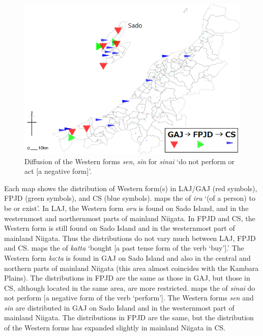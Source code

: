 \documentclass[output=paper]{LSP/langsci}
\begin{document}
\begin{figure}
\includegraphics[width=.75\textwidth]{illustrations/fuku2_fig2c}
\caption{Diffusion of the Western forms \textit{sen}, \textit{sin} for \textit{sinai} `do not perform or act [a negative form]'.}
\label{fig:fuku:2c}
\end{figure}

Each map shows the distribution of Western form(s) in \textsc{LAJ}/\textsc{GAJ} (red symbols), \textsc{FPJD} (green symbols), and \textsc{CS} (blue symbols).   maps the  of \textit{iru} `(of a person) to be or exist'.  In \textsc{LAJ}, the Western form \textit{oru} is found on Sado Island, and in the westernmost and northernmost parts of mainland Niigata.  In \textsc{FPJD} and \textsc{CS}, the Western form is still found on Sado Island and in the westernmost part of mainland Niigata.  Thus the distributions do not vary much between \textsc{LAJ}, \textsc{FPJD} and \textsc{CS}.   maps the  of \textit{katta} `bought [a past tense form of the verb `buy'].'  The Western form \textit{koːta} is found in \textsc{GAJ} on Sado Island and also in the central and northern parts of mainland Niigata (this area almost coincides with the Kambara Plains).  The distributions in \textsc{FPJD} are the same as those in \textsc{GAJ}, but those in \textsc{CS}, although located in the same area, are more restricted.   maps the  of \textit{sinai} {\textquotedbl}do not perform [a negative form of the verb `perform'].{\textquotedbl} The Western forms \textit{sen} and \textit{sin} are distributed in \textsc{GAJ} on Sado Island and in the westernmost part of mainland Niigata. The distributions in \textsc{FPJD} are the same, but the distribution of the Western forms has expanded slightly  in mainland Niigata in \textsc{CS}.
\end{document}
